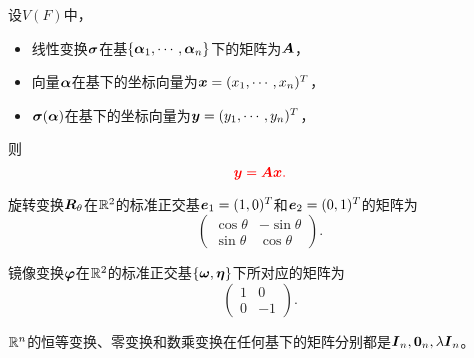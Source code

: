 \begin{frame}
  \begin{dingli}
    设$V(F)$中，
    \begin{itemize}
    \item 线性变换$\boldsymbol{\sigma}$在基$\{\boldsymbol{\alpha}_1,\cdots,\boldsymbol{\alpha}_n\}$下的矩阵为$\boldsymbol{A}$，\\[.1in]
    \item 向量$\boldsymbol{\alpha}$在基下的坐标向量为${\boldsymbol{x}}=(x_1,\cdots,x_n)^T$，\\[.1in]
    \item $\boldsymbol{\sigma}(\boldsymbol{\alpha})$在基下的坐标向量为${\boldsymbol{y}}=(y_1,\cdots,y_n)^T$，\\[.1in]
    \end{itemize}
    则
    $$
    \textcolor{red}{{\boldsymbol{y}}=\boldsymbol{A}{\boldsymbol{x}}.}
    $$
  \end{dingli} 
\end{frame}

\begin{frame}
   \begin{li}
    旋转变换$\boldsymbol{R}_\theta$在$\mathbb R^2$的标准正交基${\boldsymbol{e}}_1=(1,0)^T$和${\boldsymbol{e}}_2=(0,1)^T$的矩阵为
    $$
    \left(
      \begin{array}{rr}
        \cos\theta&-\sin\theta\\
        \sin\theta& \cos\theta
      \end{array}
    \right).
    $$
  \end{li} 
   
  \begin{li}
    镜像变换$\boldsymbol{\varphi}$在$\mathbb R^2$的标准正交基$\{\boldsymbol{\omega},\boldsymbol{\eta}\}$下所对应的矩阵为
    $$
    \left(
      \begin{array}{rr}
        1&0\\
        0&-1
      \end{array}
    \right).
    $$
  \end{li}  
  
  \begin{li}
    $\mathbb R^n$的恒等变换、零变换和数乘变换在任何基下的矩阵分别都是$\MI_n, \M0_{n},\lambda \MI_n $。
  \end{li}
\end{frame}

